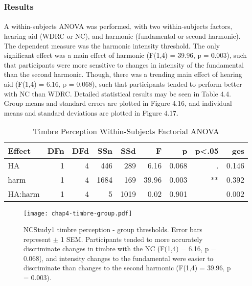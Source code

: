 \subsubsection{Results}
\paragraph{}A within-subjects ANOVA was performed, with two within-subjects factors, hearing aid (WDRC or NC), and harmonic (fundamental or second harmonic).  The dependent measure was the harmonic intensity threshold.  The only significant effect was a main effect of harmonic (F(1,4) = 39.96, p = 0.003), such that participants were more sensitive to changes in intensity of the fundamental than the second harmonic.  Though, there was a trending main effect of hearing aid (F(1,4) = 6.16, p = 0.068), such that participants tended to perform better with NC than WDRC.  Detailed statistical results may be seen in Table 4.4.  Group means and standard errors are plotted in Figure 4.16, and individual means and standard deviations are plotted in Figure 4.17.

\begin{table}[htp]
\begin{center}
\begin{tabular}{lrrrrrrrr}
       Effect & DFn & DFd  &  SSn &  SSd  &    F  &     p & p<.05  &   ges
       \\
       \hline
          HA &  1 &  4 &   446 & 289 &  6.16 & 0.068  &   .  & 0.146 \\
        harm  & 1 &  4 &  1684 & 169 & 39.96 & 0.003  &   ** & 0.392 \\
     HA:harm &  1 &  4 &     5 & 1019 &  0.02 & 0.901 &     & 0.002 \\
     \hline
\end{tabular}
\end{center}
\caption{Timbre Perception Within-Subjects Factorial ANOVA}
\end{table}

\begin{figure}[htp]
\begin{center}
\texttt{[image: chap4-timbre-group.pdf]} \\
\caption[NCStudy1 timbre perception - group thresholds]{NCStudy1 timbre perception - group thresholds.  Error bars represent $\pm$ 1 SEM.  Participants tended to more accurately discriminate changes in timbre with the NC (F(1,4) = 6.16, p = 0.068), and intensity changes to the fundamental were easier to discriminate than changes to the second harmonic (F(1,4) = 39.96, p = 0.003).}
\label{ch4-timbre-group}
\end{center}
\end{figure}

